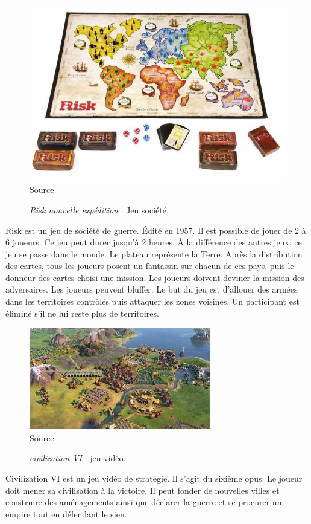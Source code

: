 \begin{figure}[H]
    \centering
    \includegraphics[scale=0.4]{data/risk.jpg}\\
    Source 
    \caption{\textit{Risk nouvelle expédition} : Jeu société.}
\end{figure}
Risk est un jeu de société de guerre. Édité en 1957. Il est possible de jouer de 2 à 6 joueurs. Ce jeu peut durer jusqu'à 2 heures. À la différence des autres jeux, ce jeu se passe dans le monde. Le plateau représente la Terre.
Après la distribution des cartes, tous les joueurs posent un fantassin sur chacun de ces pays, puis le donneur des cartes choisi une mission. Les joueurs doivent deviner la mission des adversaires.
Les joueurs peuvent bluffer.
Le but du jeu est d'allouer des armées dans les territoires contrôlés puis attaquer les zones voisines. Un participant est éliminé s’il ne lui reste plus de territoires.


\begin{figure}[H]
    \centering
    \includegraphics[scale=0.8]{data/civilization.jpeg}\\
    Source 
    \caption{\textit{civilization VI} : jeu vidéo.}
\end{figure}
Civilization VI est un jeu vidéo de stratégie. Il s'agit du sixième opus.
Le joueur doit mener sa civilisation à la victoire.
Il peut fonder de nouvelles villes et construire des aménagements ainsi que déclarer la guerre et se procurer un empire tout en défendant le sien.


